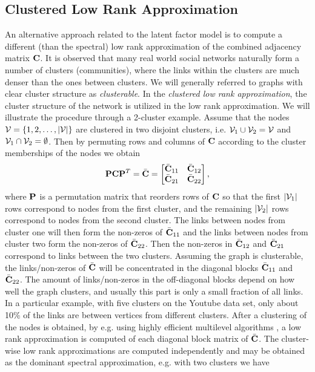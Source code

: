 \subsection{Clustered Low Rank Approximation}
An alternative approach related to the latent factor model is to compute a different (than the spectral) low rank approximation of the combined adjacency matrix $\mathbf{C}$. It is observed that many real world social networks naturally form  a number of clusters (communities), where the links within the clusters are much denser than the ones between clusters. We will generally referred to graphs with clear cluster structure as \emph{clusterable}. In the \textit{clustered low rank approximation}, \cite{savas10c,song10} the cluster structure of the network is utilized in the low rank approximation. We will illustrate the procedure through a 2-cluster example. Assume that the nodes $\mathcal{V} = \{1, 2, \dots, |\mathcal{V} | \}$ are clustered in two disjoint clusters, i.e. $\mathcal{V}_1 \cup \mathcal{V}_2 = \mathcal{V}$ and $\mathcal{V}_1 \cap \mathcal{V}_2 = \emptyset$. Then by permuting rows and columns of $\mathbf{C}$  according to the cluster memberships of the nodes we obtain
\[
 \mathbf{P} \mathbf{C} \mathbf{P}^T = \bar{\mathbf{C}} =
\begin{bmatrix}
\bar{\mathbf{C}}_{11} & \bar{\mathbf{C}}_{12} \\
\bar{\mathbf{C}}_{21} & \bar{\mathbf{C}}_{22}
\end{bmatrix},
\]
where $\mathbf{P}$ is a permutation matrix that reorders rows of $\mathbf{C}$ so that the first $|\mathcal{V}_1|$ rows correspond to nodes from the first cluster, and the remaining $|\mathcal{V}_2|$ rows correspond to nodes from the second cluster. The links between nodes from cluster one will then form the non-zeros of $\bar{\mathbf{C}}_{11}$ and the links between nodes from cluster two form the non-zeros of $\bar{\mathbf{C}}_{22}$. Then the non-zeros in $\bar{\mathbf{C}}_{12}$ and $\bar{\mathbf{C}}_{21}$ correspond to links between the two clusters. Assuming the graph is clusterable, the links/non-zeros of $\bar{\mathbf{C}}$ will be concentrated in the diagonal blocks $\bar{\mathbf{C}}_{11}$ and $\bar{\mathbf{C}}_{22}$. The amount of links/non-zeros in the off-diagonal blocks depend on how well the graph clusters, and usually this part is only a small fraction of all links. In a particular example, with five clusters on the Youtube data set, only about 10\% of the links are between vertices from different clusters. After a clustering of the nodes is obtained, by e.g. using highly efficient multilevel algorithms \cite{dhillon07,karypis98a}, a low rank approximation is computed of each diagonal block matrix of $\bar{\mathbf{C}}$.  The cluster-wise low rank approximations are computed independently and may be obtained as the dominant spectral approximation, e.g. with two clusters we have
